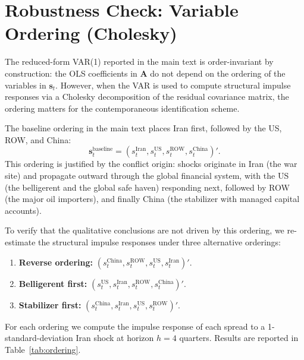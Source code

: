 \documentclass[12pt]{article}
\begin{document}

\section{Robustness Check: Variable Ordering (Cholesky)}
\label{app:ordering}

The reduced-form VAR(1) reported in the main text is order-invariant by construction: the OLS coefficients in $\mathbf{A}$ do not depend on the ordering of the variables in $\mathbf{s}_t$. However, when the VAR is used to compute structural impulse responses via a Cholesky decomposition of the residual covariance matrix, the ordering matters for the contemporaneous identification scheme.

The baseline ordering in the main text places Iran first, followed by the US, ROW, and China:
\begin{equation}
\mathbf{s}_t^{\text{baseline}} = (s^{\text{Iran}}_t, s^{\text{US}}_t, s^{\text{ROW}}_t, s^{\text{China}}_t)'.
\end{equation}
This ordering is justified by the conflict origin: shocks originate in Iran (the war site) and propagate outward through the global financial system, with the US (the belligerent and the global safe haven) responding next, followed by ROW (the major oil importers), and finally China (the stabilizer with managed capital accounts).

To verify that the qualitative conclusions are not driven by this ordering, we re-estimate the structural impulse responses under three alternative orderings:
\begin{enumerate}[itemsep=2pt, topsep=2pt]
    \item \textbf{Reverse ordering:} $(s^{\text{China}}_t, s^{\text{ROW}}_t, s^{\text{US}}_t, s^{\text{Iran}}_t)'$.
    \item \textbf{Belligerent first:} $(s^{\text{US}}_t, s^{\text{Iran}}_t, s^{\text{ROW}}_t, s^{\text{China}}_t)'$.
    \item \textbf{Stabilizer first:} $(s^{\text{China}}_t, s^{\text{Iran}}_t, s^{\text{US}}_t, s^{\text{ROW}}_t)'$.
\end{enumerate}
For each ordering we compute the impulse response of each spread to a 1-standard-deviation Iran shock at horizon $h = 4$ quarters. Results are reported in Table~\ref{tab:ordering}.
\end{document}

